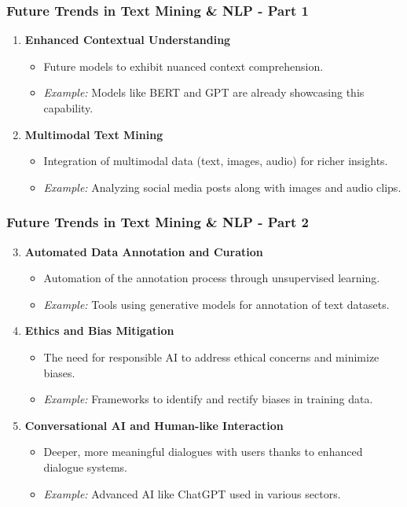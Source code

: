 \documentclass[aspectratio=169]{beamer}
\begin{document}
\begin{frame}[fragile]
    \frametitle{Future Trends in Text Mining \& NLP - Part 1}
    \begin{enumerate}
        \item \textbf{Enhanced Contextual Understanding}
        \begin{itemize}
            \item Future models to exhibit nuanced context comprehension.
            \item \textit{Example:} Models like BERT and GPT are already showcasing this capability.
        \end{itemize}
        
        \item \textbf{Multimodal Text Mining}
        \begin{itemize}
            \item Integration of multimodal data (text, images, audio) for richer insights.
            \item \textit{Example:} Analyzing social media posts along with images and audio clips.
        \end{itemize}
    \end{enumerate}
\end{frame}

\begin{frame}[fragile]
    \frametitle{Future Trends in Text Mining \& NLP - Part 2}
    \begin{enumerate}
        \setcounter{enumi}{2}
        \item \textbf{Automated Data Annotation and Curation}
        \begin{itemize}
            \item Automation of the annotation process through unsupervised learning.
            \item \textit{Example:} Tools using generative models for annotation of text datasets.
        \end{itemize}

        \item \textbf{Ethics and Bias Mitigation}
        \begin{itemize}
            \item The need for responsible AI to address ethical concerns and minimize biases.
            \item \textit{Example:} Frameworks to identify and rectify biases in training data.
        \end{itemize}

        \item \textbf{Conversational AI and Human-like Interaction}
        \begin{itemize}
            \item Deeper, more meaningful dialogues with users thanks to enhanced dialogue systems.
            \item \textit{Example:} Advanced AI like ChatGPT used in various sectors.
        \end{itemize}
    \end{enumerate}
\end{frame}
\end{document}
